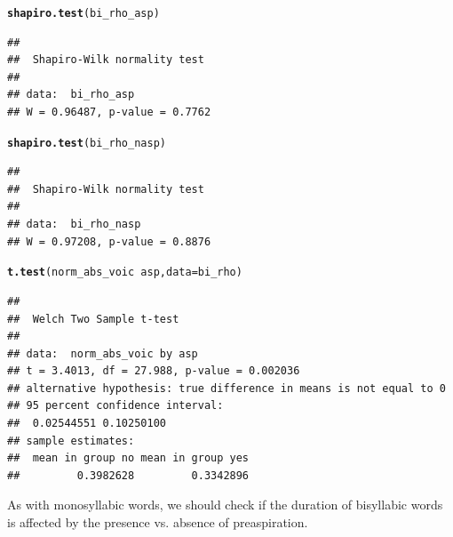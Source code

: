 \documentclass[a4paper,11pt]{article}\usepackage[]{graphicx}\usepackage[]{color}
\makeatletter
\newcommand{\hlopt}[1]{\textcolor[rgb]{0,0,0}{#1}}%
\newcommand{\hlstd}[1]{\textcolor[rgb]{0.345,0.345,0.345}{#1}}%
\newcommand{\hlkwc}[1]{\textcolor[rgb]{0.333,0.667,0.333}{#1}}%
\newcommand{\hlkwd}[1]{\textcolor[rgb]{0.737,0.353,0.396}{\textbf{#1}}}%
\newenvironment{kframe}{%
 \def\at@end@of@kframe{}%
 \ifinner\ifhmode%
  \def\at@end@of@kframe{\end{minipage}}%
  \begin{minipage}{\columnwidth}%
 \fi\fi%
 \def\FrameCommand##1{\hskip\@totalleftmargin \hskip-\fboxsep
 \colorbox{shadecolor}{##1}\hskip-\fboxsep
     \hskip-\linewidth \hskip-\@totalleftmargin \hskip\columnwidth}%
 \MakeFramed {\advance\hsize-\width
   \@totalleftmargin\z@ \linewidth\hsize
   \@setminipage}}%
 {\par\unskip\endMakeFramed%
 \at@end@of@kframe}
\newenvironment{knitrout}{}{} %
\makeatother
\begin{document}
\begin{knitrout}
\color{fgcolor}\begin{kframe}
\begin{alltt}
\hlkwd{shapiro.test}\hlstd{(bi_rho_asp)}
\end{alltt}
\begin{verbatim}
## 
## 	Shapiro-Wilk normality test
## 
## data:  bi_rho_asp
## W = 0.96487, p-value = 0.7762
\end{verbatim}
\begin{alltt}
\hlkwd{shapiro.test}\hlstd{(bi_rho_nasp)}
\end{alltt}
\begin{verbatim}
## 
## 	Shapiro-Wilk normality test
## 
## data:  bi_rho_nasp
## W = 0.97208, p-value = 0.8876
\end{verbatim}
\begin{alltt}
\hlkwd{t.test}\hlstd{(norm_abs_voic} \hlopt{~} \hlstd{asp,} \hlkwc{data} \hlstd{= bi_rho)}
\end{alltt}
\begin{verbatim}
## 
## 	Welch Two Sample t-test
## 
## data:  norm_abs_voic by asp
## t = 3.4013, df = 27.988, p-value = 0.002036
## alternative hypothesis: true difference in means is not equal to 0
## 95 percent confidence interval:
##  0.02544551 0.10250100
## sample estimates:
##  mean in group no mean in group yes 
##         0.3982628         0.3342896
\end{verbatim}
\end{kframe}
\end{knitrout}

As with monosyllabic words, we should check if the duration of bisyllabic words is affected by the presence vs. absence of preaspiration.
\end{document}
